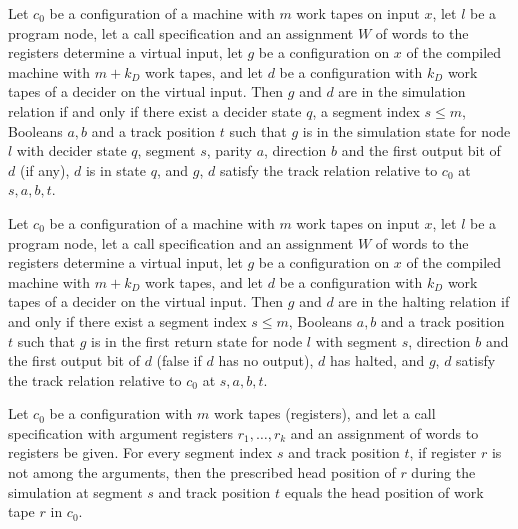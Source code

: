 \begin{lemma}
\label{Complexity.LogProg.simRel_iff}
\leanok
{}
Let $c_0$ be a configuration of a machine with $m$ work tapes on input $x$, let $l$ be a
program node, let a call specification and an assignment $W$ of words to the registers
determine a virtual input, let $g$ be a configuration on $x$ of the compiled machine with
$m+k_D$ work tapes, and let $d$ be a configuration with $k_D$ work tapes of a decider on
the virtual input. Then $g$ and $d$ are in the simulation relation if and only if there
exist a decider state $q$, a segment index $s\le m$, Booleans $a,b$ and a track position
$t$ such that $g$ is in the simulation state for node $l$ with decider state $q$, segment
$s$, parity $a$, direction $b$ and the first output bit of $d$ (if any), $d$ is in state
$q$, and $g$, $d$ satisfy the track relation relative to $c_0$ at $s,a,b,t$.
\end{lemma}

\begin{lemma}
\label{Complexity.LogProg.haltRel_iff}
\leanok
{}
Let $c_0$ be a configuration of a machine with $m$ work tapes on input $x$, let $l$ be a
program node, let a call specification and an assignment $W$ of words to the registers
determine a virtual input, let $g$ be a configuration on $x$ of the compiled machine with
$m+k_D$ work tapes, and let $d$ be a configuration with $k_D$ work tapes of a decider on
the virtual input. Then $g$ and $d$ are in the halting relation if and only if there
exist a segment index $s\le m$, Booleans $a,b$ and a track position $t$ such that $g$ is
in the first return state for node $l$ with segment $s$, direction $b$ and the first
output bit of $d$ (false if $d$ has no output), $d$ has halted, and $g$, $d$ satisfy the
track relation relative to $c_0$ at $s,a,b,t$.
\end{lemma}

\begin{lemma}
\label{Complexity.LogProg.regPos_of_not_mem}
\leanok
{}
Let $c_0$ be a configuration with $m$ work tapes (registers), and let a call specification
with argument registers $r_1,\dots,r_k$ and an assignment of words to registers be given.
For every segment index $s$ and track position $t$, if register $r$ is not among the
arguments, then the prescribed head position of $r$ during the simulation at segment $s$
and track position $t$ equals the head position of work tape $r$ in $c_0$.
\end{lemma}

